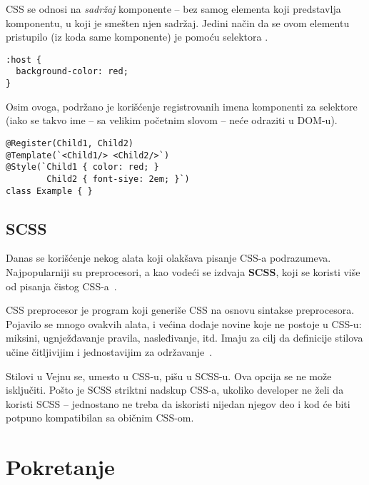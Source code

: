 CSS se odnosi na \emph{sadržaj} komponente -- bez samog elementa koji predstavlja komponentu, u koji je smešten njen sadržaj.
Jedini način da se ovom elementu pristupilo  (iz koda same komponente) je pomoću selektora .

\begin{verbatim}
:host {
  background-color: red;
}
\end{verbatim}

Osim ovoga, podržano je korišćenje registrovanih imena komponenti za selektore (iako se takvo ime -- sa velikim početnim slovom -- neće odraziti u DOM-u).

\begin{verbatim}
@Register(Child1, Child2)
@Template(`<Child1/> <Child2/>`)
@Style(`Child1 { color: red; }
        Child2 { font-siye: 2em; }`)
class Example { }
\end{verbatim}



\subsection{SCSS}

Danas se korišćenje nekog alata koji olakšava pisanje CSS-a podrazumeva.
Najpopularniji su preprocesori, a kao vodeći se izdvaja \textbf{SCSS}, koji se koristi više od pisanja čistog CSS-a~\cite{sojs:2017}.

CSS preprocesor je program koji generiše CSS na osnovu sintakse preprocesora.
Pojavilo se mnogo ovakvih alata, i većina dodaje novine koje ne postoje u CSS-u: miksini, ugnježđavanje pravila, nasleđivanje, itd.
Imaju za cilj da definicije stilova učine čitljivijim i jednostavijim za održavanje~\cite{mdn:glossary:css-preprocessor}.

Stilovi u Vejnu se, umesto u CSS-u, pišu u SCSS-u.
Ova opcija se ne može isključiti.
Pošto je SCSS striktni nadskup CSS-a, ukoliko developer ne želi da koristi SCSS -- jednostano ne treba da iskoristi nijedan njegov deo i kod će biti potpuno kompatibilan sa običnim CSS-om.

\section{Pokretanje}

